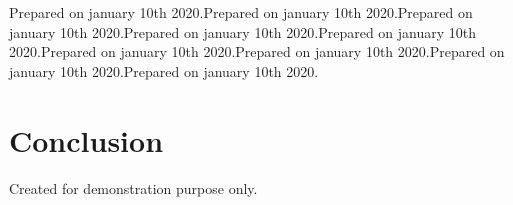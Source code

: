 \documentclass[12pt]{report} %
\begin{document}
\begin{multicols}{2}
Prepared on january 10th 2020.Prepared on january 10th 2020.Prepared on january 10th 2020.Prepared on january 10th 2020.Prepared on january 10th 2020.Prepared on january 10th 2020.Prepared on january 10th 2020.Prepared on january 10th 2020.Prepared on january 10th 2020.



\section{Conclusion} Created for demonstration purpose only.
\end{multicols}
\end{document}
